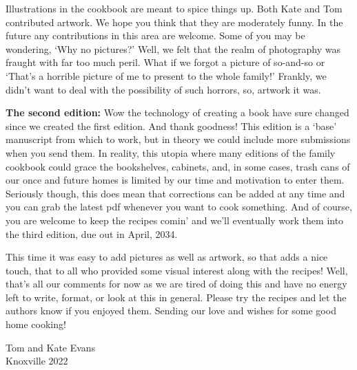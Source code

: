 \documentclass[12pt]{article}
\begin{document}
Illustrations in the cookbook are meant to spice things up. Both Kate and
Tom contributed artwork.  We hope you think that they are moderately
funny.  In the future any contributions in this area are welcome.  Some
of you may be wondering, `Why no pictures?'  Well, we felt that the realm
of photography was fraught with far too much peril.  What if we forgot a
picture of so-and-so or `That's a horrible picture of me to present to
the whole family!'  Frankly, we didn't want to deal with the possibility
of such horrors, so, artwork it was.


\textbf{The second edition:}
Wow the technology of creating a book have sure changed since we created the first edition. And thank goodness!
This edition is a `base' manuscript from which to work, but in theory we could include more submissions when you send them. In reality,  this utopia where many editions of the family cookbook could grace the bookshelves, cabinets, and, in some cases, trash cans of our once and future homes is limited by our time and motivation to enter them. Seriously though, this does mean that corrections can be added at any time and you can grab the latest pdf whenever you want to cook something. And of course, you are welcome to keep the recipes comin' and we'll eventually work them into the third edition, due out in April, 2034.

This time it was easy to add pictures as well as artwork, so that adds a nice touch, that to all who provided some visual interest along with the recipes! Well, that's all our comments for now as we are tired of doing this and
have no energy left to write, format, or look at this in general.  Please
try the recipes and let the authors know if you enjoyed them. Sending our love and wishes for some good home cooking!  

\vspace{.5in}
\begin{flushright}
Tom and Kate Evans\\ Knoxville 2022
\end{flushright}

\end{document}
